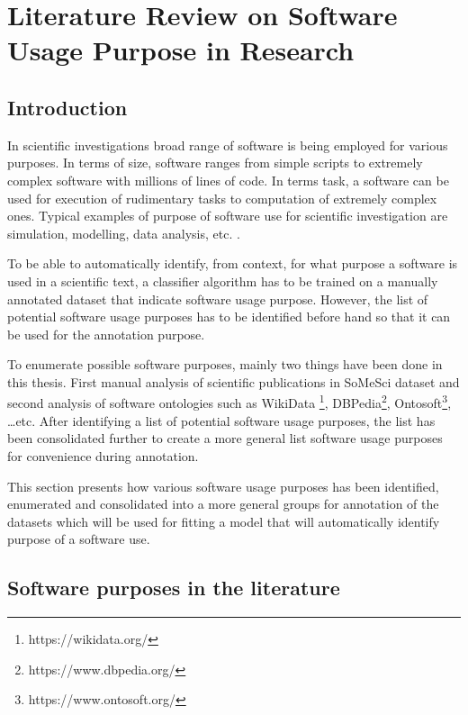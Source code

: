 \chapter{Literature Review on Software Usage Purpose in Research }
\label{ch:chapter03}
 

%
%
\section{Introduction}
\label{sec:chapter03:intro}
In scientific investigations broad range of software is being employed for various purposes. In terms of size, software ranges from simple scripts to extremely complex software with millions of lines of code. In terms task, a software can be used for execution of rudimentary tasks to computation of extremely complex ones. Typical examples of purpose of software use for scientific investigation are simulation, modelling, data analysis, etc. \citep{goble2014better}.  

To be able to automatically identify, from context, for what purpose a software is used in a scientific text, a classifier algorithm has to be trained on a manually annotated dataset that indicate software usage purpose. However, the list of potential software usage purposes has to be identified before hand so that it can be used for the annotation purpose. 

To enumerate possible software purposes, mainly two things have been done in this thesis. First manual analysis of scientific publications in SoMeSci dataset and second  analysis of software ontologies such as WikiData \footnote{https://wikidata.org/}, DBPedia\footnote{https://www.dbpedia.org/}, Ontosoft\footnote{https://www.ontosoft.org/}, …etc. After identifying a list of potential software usage purposes, the list has been consolidated further to create a more general list software usage purposes for convenience during annotation.  

This section presents how various software usage purposes has been identified, enumerated and consolidated into a more general groups for annotation of the datasets which will be used for fitting a model that will automatically identify purpose of a software use. 

\section{Software purposes in the literature}

